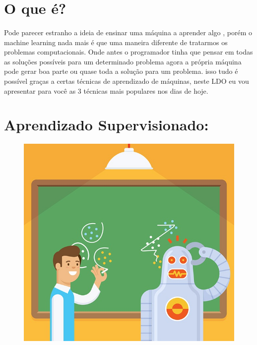 \documentclass{article}
\begin{document}
    \section{O que é?}
    \paragraph{}
    Pode parecer estranho a ideia de ensinar uma máquina a aprender algo , porém o machine learning nada mais é 
    que uma maneira diferente de tratarmos os problemas computacionais. Onde antes o programador tinha que pensar 
    em todas as soluções possíveis para um determinado problema agora a própria máquina pode gerar boa parte ou quase 
    toda a solução para um problema. isso tudo é possível graças a certas técnicas de aprendizado de máquinas, neste 
    LDO eu vou apresentar para você as 3 técnicas mais populares nos dias de hoje.    

    \section{Aprendizado Supervisionado:}
    \begin{figure}[ht]
        \centering
        \includegraphics[scale=0.3]{robo_aprendedo.jpg}
    \end{figure}
\end{document}

